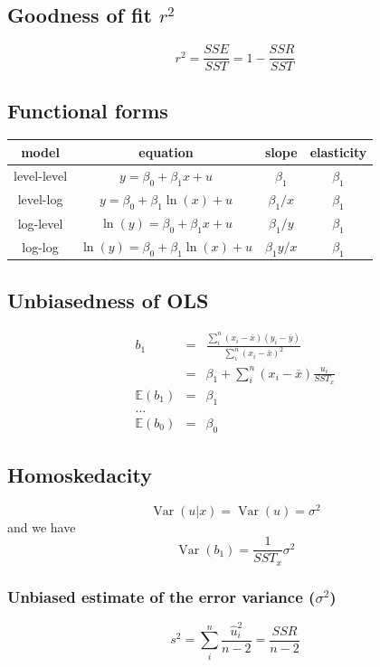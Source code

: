 \documentclass[a4paper,titlepage] {scrartcl}
\begin{document}
\subsection{Goodness of fit $r^2$}
\begin{equation}
	r^2=\frac{SSE}{SST} = 1 - \frac{SSR}{SST}
\end{equation}

\subsection{Functional forms}
\begin{tabular}{cccc}
\hline
model & equation & slope & elasticity\\
\hline
level-level & $y = \beta_0+\beta_1x+u$ & $\beta_1$ & $\beta_1$\\
\hline
level-log & $y = \beta_0+\beta_1\ln(x)+u$ & $\beta_1/x$ & $\beta_1$\\
\hline
log-level & $\ln(y) = \beta_0+\beta_1x+u$ & $\beta_1/y$ & $\beta_1$\\
\hline
log-log & $\ln(y) = \beta_0+\beta_1\ln(x)+u$ & $\beta_1y/x$ & $\beta_1$\\
\hline
\end{tabular}


\subsection{Unbiasedness of OLS}
\begin{eqnarray}
	b_1 &=&  \frac{\sum_i^n(x_i-\overline x)(y_i-\overline y)}{\sum_i^n(x_i-\overline x)^2}
	\\
	&=& \beta_1 + \sum_i^n(x_i-\overline x)\frac{u_i}{SST_x}
	\\
	\mathbb E{(b_1)}&=&\beta_1
	\\
	...
	\\
	\mathbb E(b_0)&=&\beta_0
\end{eqnarray}

\subsection{Homoskedacity}
\begin{equation}
	\operatorname{Var}(u|x)=\operatorname{Var}(u)=\sigma^2
\end{equation}
and we have
\begin{equation}
	\operatorname{Var}(b_1)=\frac{1}{SST_x}\sigma^2
\end{equation}

\subsubsection{Unbiased estimate of the error variance ($\sigma^2$)}
\begin{equation}
	s^2 = \sum_i^n\frac{\hat u_i^2}{n-2} = \frac{SSR}{n-2}
\end{equation}
\end{document}
